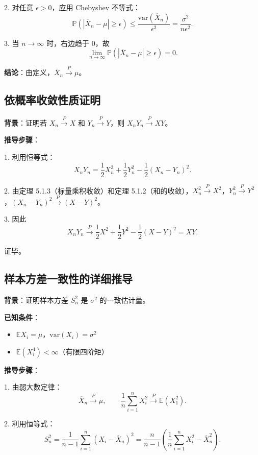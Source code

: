 2. 对任意 $\epsilon > 0$，应用 Chebyshev 不等式：
\[
\mathbb{P}(|\overline{X}_n - \mu| \geq \epsilon) \leq \frac{\text{var}(\overline{X}_n)}{\epsilon^2} = \frac{\sigma^2}{n\epsilon^2}.
\]

3. 当 $n \to \infty$ 时，右边趋于 $0$，故
\[
\lim_{n \to \infty} \mathbb{P}(|\overline{X}_n - \mu| \geq \epsilon) = 0.
\]

\textbf{结论}：由定义，$\overline{X}_n \xrightarrow{P} \mu$。

\subsection{依概率收敛性质证明}\label{sec:convergence-product-proof}

\textbf{背景}：证明若 $X_n \xrightarrow{P} X$ 和 $Y_n \xrightarrow{P} Y$，则 $X_n Y_n \xrightarrow{P} XY$。

\textbf{推导步骤}：

1. 利用恒等式：
\[
X_n Y_n = \frac{1}{2}X_n^2 + \frac{1}{2}Y_n^2 - \frac{1}{2}(X_n - Y_n)^2.
\]

2. 由定理 5.1.3（标量乘积收敛）和定理 5.1.2（和的收敛），$X_n^2 \xrightarrow{P} X^2$，$Y_n^2 \xrightarrow{P} Y^2$，$(X_n - Y_n)^2 \xrightarrow{P} (X - Y)^2$。

3. 因此
\[
X_n Y_n \xrightarrow{P} \frac{1}{2}X^2 + \frac{1}{2}Y^2 - \frac{1}{2}(X - Y)^2 = XY.
\]

证毕。

\subsection{样本方差一致性的详细推导}\label{sec:sample-variance-consistency}

\textbf{背景}：证明样本方差 $S_n^2$ 是 $\sigma^2$ 的一致估计量。

\textbf{已知条件}：
\begin{itemize}
\item $\mathbb{E}X_i = \mu$，$\text{var}(X_i) = \sigma^2$
\item $\mathbb{E}(X_i^4) < \infty$（有限四阶矩）
\end{itemize}

\textbf{推导步骤}：

1. 由弱大数定律：
\[
\overline{X}_n \xrightarrow{P} \mu,\qquad \frac{1}{n}\sum_{i=1}^n X_i^2 \xrightarrow{P} \mathbb{E}(X_1^2).
\]

2. 利用恒等式：
\[
S_n^2 = \frac{1}{n-1}\sum_{i=1}^n (X_i - \overline{X}_n)^2 = \frac{n}{n-1}\left(\frac{1}{n}\sum_{i=1}^n X_i^2 - \overline{X}_n^2\right).
\]

